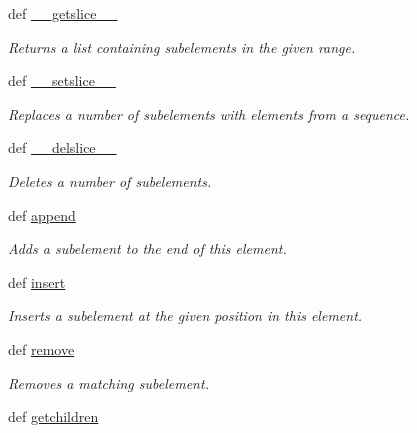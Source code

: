 \begin{DoxyCompactItemize}
def \hyperlink{classPyQt-x11-gpl-4_811_82_1_1elementtree_1_1ElementTree_1_1__ElementInterface_a520ad925cbf9011070cad307f05a7ff3}{\+\_\+\+\_\+getslice\+\_\+\+\_\+}
\begin{DoxyCompactList}\small\item\em Returns a list containing subelements in the given range. \end{DoxyCompactList}\item 
def \hyperlink{classPyQt-x11-gpl-4_811_82_1_1elementtree_1_1ElementTree_1_1__ElementInterface_abf2d6c5317dccd7b39c8eaa43a642404}{\+\_\+\+\_\+setslice\+\_\+\+\_\+}
\begin{DoxyCompactList}\small\item\em Replaces a number of subelements with elements from a sequence. \end{DoxyCompactList}\item 
def \hyperlink{classPyQt-x11-gpl-4_811_82_1_1elementtree_1_1ElementTree_1_1__ElementInterface_a6d739c76e3310dd683dbf1c067c34cbb}{\+\_\+\+\_\+delslice\+\_\+\+\_\+}
\begin{DoxyCompactList}\small\item\em Deletes a number of subelements. \end{DoxyCompactList}\item 
def \hyperlink{classPyQt-x11-gpl-4_811_82_1_1elementtree_1_1ElementTree_1_1__ElementInterface_ad4ac5f8e39bcc5061bcc2b8e9affd14a}{append}
\begin{DoxyCompactList}\small\item\em Adds a subelement to the end of this element. \end{DoxyCompactList}\item 
def \hyperlink{classPyQt-x11-gpl-4_811_82_1_1elementtree_1_1ElementTree_1_1__ElementInterface_adf4d29ab8e2fbbf1c70e680c48a91d65}{insert}
\begin{DoxyCompactList}\small\item\em Inserts a subelement at the given position in this element. \end{DoxyCompactList}\item 
def \hyperlink{classPyQt-x11-gpl-4_811_82_1_1elementtree_1_1ElementTree_1_1__ElementInterface_aaa81d3f8163ba8a21b7829a68cd4154d}{remove}
\begin{DoxyCompactList}\small\item\em Removes a matching subelement. \end{DoxyCompactList}\item 
def \hyperlink{classPyQt-x11-gpl-4_811_82_1_1elementtree_1_1ElementTree_1_1__ElementInterface_a32f01c8b2d64923cd2c2c207607dcf44}{getchildren}

\end{DoxyCompactItemize}

